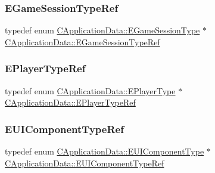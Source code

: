 \subsubsection{\texorpdfstring{E\+Game\+Session\+Type\+Ref}{EGameSessionTypeRef}}
{\footnotesize\ttfamily typedef  enum \hyperlink{classCApplicationData_a0ec00515bf6b4b469b43ad62d615e3fa}{C\+Application\+Data\+::\+E\+Game\+Session\+Type} $\ast$ \hyperlink{classCApplicationData_acfb51c61ccc20a0cd5daa02973ab0870}{C\+Application\+Data\+::\+E\+Game\+Session\+Type\+Ref}\hspace{0.3cm}{\ttfamily [protected]}}

\hypertarget{classCApplicationData_a26f033ac5752403a511af304618f90fd}{}\label{classCApplicationData_a26f033ac5752403a511af304618f90fd} 
\subsubsection{\texorpdfstring{E\+Player\+Type\+Ref}{EPlayerTypeRef}}
{\footnotesize\ttfamily typedef  enum \hyperlink{classCApplicationData_ae04b6b340297311972ce1e955196fcaa}{C\+Application\+Data\+::\+E\+Player\+Type} $\ast$ \hyperlink{classCApplicationData_a26f033ac5752403a511af304618f90fd}{C\+Application\+Data\+::\+E\+Player\+Type\+Ref}\hspace{0.3cm}{\ttfamily [protected]}}

\hypertarget{classCApplicationData_a117c7e1886e2db3be85388b120ad1d34}{}\label{classCApplicationData_a117c7e1886e2db3be85388b120ad1d34} 
\subsubsection{\texorpdfstring{E\+U\+I\+Component\+Type\+Ref}{EUIComponentTypeRef}}
{\footnotesize\ttfamily typedef  enum \hyperlink{classCApplicationData_ad49585591fc53bff1c89bc512170280d}{C\+Application\+Data\+::\+E\+U\+I\+Component\+Type} $\ast$ \hyperlink{classCApplicationData_a117c7e1886e2db3be85388b120ad1d34}{C\+Application\+Data\+::\+E\+U\+I\+Component\+Type\+Ref}\hspace{0.3cm}{\ttfamily [protected]}}




